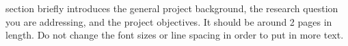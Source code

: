 \documentclass[10pt,journal,compsoc]{IEEEtran}
\begin{document}
\IEEEdisplaynontitleabstractindextext
%
\IEEEpeerreviewmaketitle






% 
% 
 section briefly introduces the general project background, the research question you are addressing, and the project objectives. It should be around 2 pages in length. Do not change the font sizes or line spacing in order to put in more text.
\end{document}
